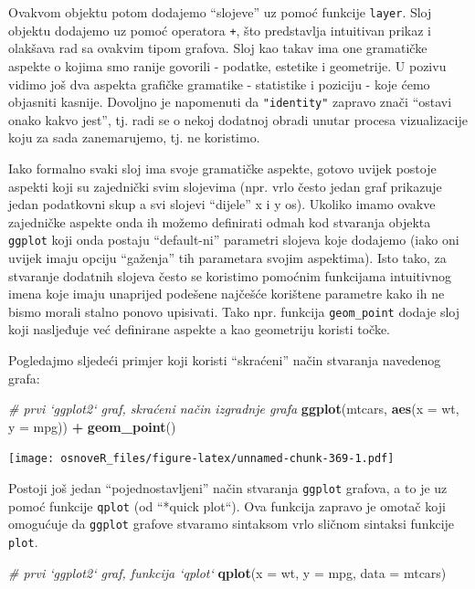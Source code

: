 \documentclass[]{book}
\newenvironment{Shaded}{\begin{snugshade}}{\end{snugshade}}
\newcommand{\KeywordTok}[1]{\textcolor[rgb]{0.13,0.29,0.53}{\textbf{#1}}}
\newcommand{\DataTypeTok}[1]{\textcolor[rgb]{0.13,0.29,0.53}{#1}}
\newcommand{\StringTok}[1]{\textcolor[rgb]{0.31,0.60,0.02}{#1}}
\newcommand{\CommentTok}[1]{\textcolor[rgb]{0.56,0.35,0.01}{\textit{#1}}}
\newcommand{\OperatorTok}[1]{\textcolor[rgb]{0.81,0.36,0.00}{\textbf{#1}}}
\newcommand{\NormalTok}[1]{#1}
\theoremstyle{definition}
\theoremstyle{definition}
\theoremstyle{definition}
\theoremstyle{remark}
\begin{document}
Ovakvom objektu potom dodajemo ``slojeve'' uz pomoć funkcije
\texttt{layer}. Sloj objektu dodajemo uz pomoć operatora \texttt{+}, što
predstavlja intuitivan prikaz i olakšava rad sa ovakvim tipom grafova.
Sloj kao takav ima one gramatičke aspekte o kojima smo ranije govorili -
podatke, estetike i geometrije. U pozivu vidimo još dva aspekta grafičke
gramatike - statistike i poziciju - koje ćemo objasniti kasnije.
Dovoljno je napomenuti da \texttt{"identity"} zapravo znači ``ostavi
onako kakvo jest'', tj. radi se o nekoj dodatnoj obradi unutar procesa
vizualizacije koju za sada zanemarujemo, tj. ne koristimo.

Iako formalno svaki sloj ima svoje gramatičke aspekte, gotovo uvijek
postoje aspekti koji su zajednički svim slojevima (npr. vrlo često jedan
graf prikazuje jedan podatkovni skup a svi slojevi ``dijele'' x i y os).
Ukoliko imamo ovakve zajedničke aspekte onda ih možemo definirati odmah
kod stvaranja objekta \texttt{ggplot} koji onda postaju ``default-ni''
parametri slojeva koje dodajemo (iako oni uvijek imaju opciju
``gaženja'' tih parametara svojim aspektima). Isto tako, za stvaranje
dodatnih slojeva često se koristimo pomoćnim funkcijama intuitivnog
imena koje imaju unaprijed podešene najčešće korištene parametre kako ih
ne bismo morali stalno ponovo upisivati. Tako npr. funkcija
\texttt{geom\_point} dodaje sloj koji nasljeđuje već definirane aspekte
a kao geometriju koristi točke.

Pogledajmo sljedeći primjer koji koristi ``skraćeni'' način stvaranja
navedenog grafa:

\begin{Shaded}
\begin{Highlighting}[]
\CommentTok{# prvi `ggplot2` graf, skraćeni način izgradnje grafa}
\KeywordTok{ggplot}\NormalTok{(mtcars, }\KeywordTok{aes}\NormalTok{(}\DataTypeTok{x =}\NormalTok{ wt, }\DataTypeTok{y =}\NormalTok{ mpg)) }\OperatorTok{+}\StringTok{ }\KeywordTok{geom_point}\NormalTok{()}
\end{Highlighting}
\end{Shaded}

\texttt{[image: osnoveR\_files/figure-latex/unnamed-chunk-369-1.pdf]}

Postoji još jedan ``pojednostavljeni'' način stvaranja \texttt{ggplot}
grafova, a to je uz pomoć funkcije \texttt{qplot} (od ``*quick plot``).
Ova funkcija zapravo je omotač koji omogućuje da \texttt{ggplot} grafove
stvaramo sintaksom vrlo sličnom sintaksi funkcije \texttt{plot}.

\begin{Shaded}
\begin{Highlighting}[]
\CommentTok{# prvi `ggplot2` graf, funkcija `qplot`}
\KeywordTok{qplot}\NormalTok{(}\DataTypeTok{x =}\NormalTok{ wt, }\DataTypeTok{y =}\NormalTok{ mpg, }\DataTypeTok{data =}\NormalTok{ mtcars)}
\end{Highlighting}
\end{Shaded}
\end{document}

